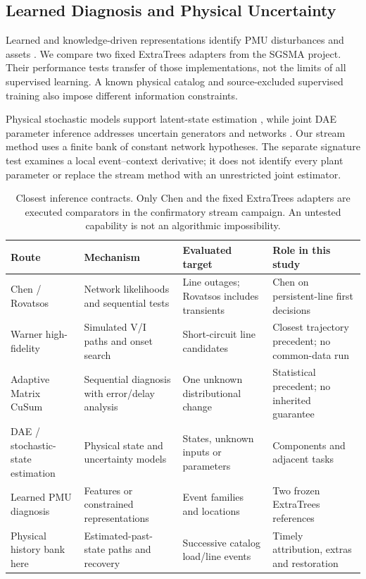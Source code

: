 \subsection{Learned Diagnosis and Physical Uncertainty}
Learned and knowledge-driven representations identify PMU disturbances and
assets \cite{pandey2020realtime,li2024knowledge,yildiz2024few}. We compare
two fixed ExtraTrees adapters from the SGSMA project. Their performance
tests transfer of those implementations, not the limits of all supervised
learning. A known physical catalog and source-excluded supervised training
also impose different information constraints.

Physical stochastic models support latent-state estimation
\cite{ensaf2023kernel,tartakovsky2023gp}, while joint DAE parameter inference
addresses uncertain generators and networks \cite{albustami2026dae}.
Our stream method uses a finite bank of constant network hypotheses.
The separate signature test examines a local event--context derivative;
it does not identify every plant parameter or replace the stream method
with an unrestricted joint estimator.

\begin{table}[t]\centering\small
\caption{Closest inference contracts. Only Chen and the fixed ExtraTrees
adapters are executed comparators in the confirmatory stream campaign.
An untested capability is not an algorithmic impossibility.}
\label{tab:literature-capability}
\begin{tabularx}{\textwidth}{@{}lXXX@{}}\toprule
Route & Mechanism & Evaluated target & Role in this study\\\midrule
Chen / Rovatsos & Network likelihoods and sequential tests & Line outages; Rovatsos includes transients & Chen on persistent-line first decisions\\
Warner high-fidelity & Simulated V/I paths and onset search & Short-circuit line candidates & Closest trajectory precedent; no common-data run\\
Adaptive Matrix CuSum & Sequential diagnosis with error/delay analysis & One unknown distributional change & Statistical precedent; no inherited guarantee\\
DAE / stochastic-state estimation & Physical state and uncertainty models & States, unknown inputs or parameters & Components and adjacent tasks\\
Learned PMU diagnosis & Features or constrained representations & Event families and locations & Two frozen ExtraTrees references\\
Physical history bank here & Estimated-past-state paths and recovery & Successive catalog load/line events & Timely attribution, extras and restoration\\\bottomrule
\end{tabularx}\end{table}
